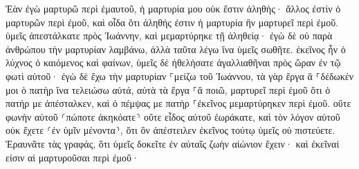 \documentclass{openreader}
\begin{document}
Ἐὰν ἐγὼ μαρτυρῶ περὶ ἐμαυτοῦ, ἡ μαρτυρία μου οὐκ ἔστιν ἀληθής· 
ἄλλος ἐστὶν ὁ μαρτυρῶν περὶ ἐμοῦ, καὶ οἶδα ὅτι ἀληθής ἐστιν ἡ μαρτυρία ἣν μαρτυρεῖ περὶ ἐμοῦ. 
ὑμεῖς ἀπεστάλκατε πρὸς Ἰωάννην, καὶ μεμαρτύρηκε τῇ ἀληθείᾳ· 
ἐγὼ δὲ οὐ παρὰ ἀνθρώπου τὴν μαρτυρίαν λαμβάνω, ἀλλὰ ταῦτα λέγω ἵνα ὑμεῖς σωθῆτε. 
ἐκεῖνος ἦν ὁ λύχνος ὁ καιόμενος καὶ φαίνων, ὑμεῖς δὲ ἠθελήσατε ἀγαλλιαθῆναι πρὸς ὥραν ἐν τῷ φωτὶ αὐτοῦ· 
ἐγὼ δὲ ἔχω τὴν μαρτυρίαν ⸀μείζω τοῦ Ἰωάννου, τὰ γὰρ ἔργα ἃ ⸀δέδωκέν μοι ὁ πατὴρ ἵνα τελειώσω αὐτά, αὐτὰ τὰ ἔργα ⸀ἃ ποιῶ, μαρτυρεῖ περὶ ἐμοῦ ὅτι ὁ πατήρ με ἀπέσταλκεν, 
καὶ ὁ πέμψας με πατὴρ ⸀ἐκεῖνος μεμαρτύρηκεν περὶ ἐμοῦ. οὔτε φωνὴν αὐτοῦ ⸂πώποτε ἀκηκόατε⸃ οὔτε εἶδος αὐτοῦ ἑωράκατε, 
καὶ τὸν λόγον αὐτοῦ οὐκ ἔχετε ⸂ἐν ὑμῖν μένοντα⸃, ὅτι ὃν ἀπέστειλεν ἐκεῖνος τούτῳ ὑμεῖς οὐ πιστεύετε. 
Ἐραυνᾶτε τὰς γραφάς, ὅτι ὑμεῖς δοκεῖτε ἐν αὐταῖς ζωὴν αἰώνιον ἔχειν· καὶ ἐκεῖναί εἰσιν αἱ μαρτυροῦσαι περὶ ἐμοῦ· 
\end{document}

